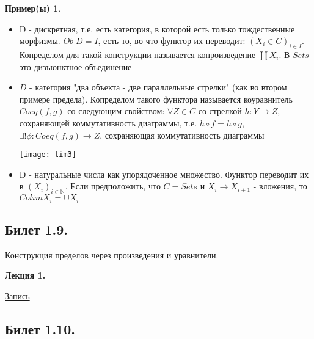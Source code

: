 \documentclass[a4paper]{article}
\newcommand{\mybox}{%
    \collectbox{%
        \setlength{\fboxsep}{1pt}%
        \fbox{\BOXCONTENT}%
    }%
}
\theoremstyle{indented}
\theoremstyle{definition}
\newtheorem{exl}{Пример(ы)}
\theoremstyle{remark}
\DeclareMathOperator{\ra}{\rightarrow}
\begin{document}
\begin{exl}
    \begin{itemize}
        \item D - дискретная, т.е. есть категория, в которой есть только тождественные морфизмы. $Ob\;D = I$, есть то, во что функтор их переводит: $(X_i \in C)_{i\in I}$. Копределом для такой конструкции называется копроизведение $\coprod X_i$. В $Sets$ это дизъюнктное объединение
        \item $D$ - категория "два объекта - две параллельные стрелки" (как во втором примере предела). Копределом такого функтора называется коуравнитель $Coeq(f, g)$ со следующим свойством: $\forall Z \in C$ со стрелкой $h: Y \ra Z$, сохраняющей коммутативность диаграммы, т.е. $h \circ f = h \circ g$, $\exists ! \phi: Coeq(f, g) \ra Z$, сохраняющая коммутативность диаграммы
        \begin{center}\texttt{[image: lim3]}\end{center}
        \item D - натуральные числа как упорядоченное множество. Функтор переводит их в $(X_i)_{i \in \mathbb{N}}$. Если предположить, что $C = Sets$ и $X_i \ra X_{i+1}$ - вложения, то $Colim X_i = \cup X_i$
    \end{itemize}
\end{exl}



\newpage

\subsection{Билет 1.9.}

Конструкция пределов через произведения и уравнители.

\hrulefill

\textbf{Лекция 1.} 

\begin{flushright}
    \mybox{
        \href{https://disk.yandex.ru/d/knoQ44wLmGDwwQ/2021-2022%20учебный%20год%20(осенний%20семестр)/2%20курс/Теоретическая%20информатика/Теор%20информатика%2C%20лекция%2C%2001.09.2021.mp4}{Запись}
    }
\end{flushright}



\newpage

\subsection{Билет 1.10.}
\end{document}
